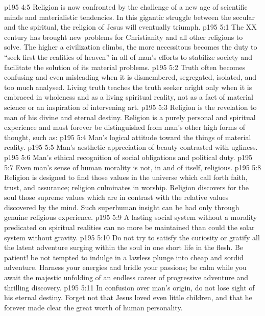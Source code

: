\vs p195 4:5 \pc Religion is now confronted by the challenge of a new age of scientific minds and materialistic tendencies. In this gigantic struggle between the secular and the spiritual, the religion of Jesus will eventually triumph.
\vs p195 5:1 The XX century has brought new problems for Christianity and all other religions to solve. The higher a civilization climbs, the more necessitous becomes the duty to “seek first the realities of heaven” in all of man’s efforts to stabilize society and facilitate the solution of its material problems.
\vs p195 5:2 Truth often becomes confusing and even misleading when it is dismembered, segregated, isolated, and too much analysed. Living truth teaches the truth seeker aright only when it is embraced in wholeness and as a living spiritual reality, not as a fact of material science or an inspiration of intervening art.
\vs p195 5:3 Religion is the revelation to man of his divine and eternal destiny. Religion is a purely personal and spiritual experience and must forever be distinguished from man’s other high forms of thought, such as:
\vs p195 5:4 \bibnobreakspace Man’s logical attitude toward the things of material reality.
\vs p195 5:5 \bibnobreakspace Man’s aesthetic appreciation of beauty contrasted with ugliness.
\vs p195 5:6 \bibnobreakspace Man’s ethical recognition of social obligations and political duty.
\vs p195 5:7 \bibnobreakspace Even man’s sense of human morality is not, in and of itself, religious.
\vs p195 5:8 \pc Religion is designed to find those values in the universe which call forth faith, trust, and assurance; religion culminates in worship. Religion discovers for the soul those supreme values which are in contrast with the relative values discovered by the mind. Such superhuman insight can be had only through genuine religious experience.
\vs p195 5:9 A lasting social system without a morality predicated on spiritual realities can no more be maintained than could the solar system without gravity.
\vs p195 5:10 Do not try to satisfy the curiosity or gratify all the latent adventure surging within the soul in one short life in the flesh. Be patient! be not tempted to indulge in a lawless plunge into cheap and sordid adventure. Harness your energies and bridle your passions; be calm while you await the majestic unfolding of an endless career of progressive adventure and thrilling discovery.
\vs p195 5:11 \pc In confusion over man’s origin, do not lose sight of his eternal destiny. Forget not that Jesus loved even little children, and that he forever made clear the great worth of human personality.
